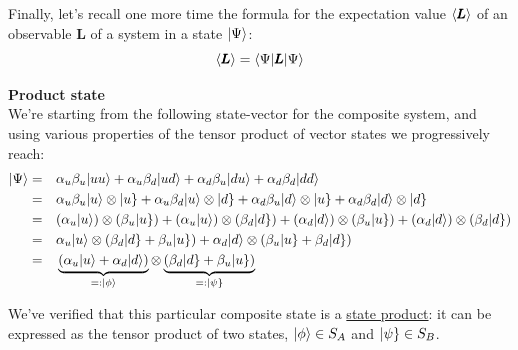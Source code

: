 \documentclass[solutions.tex]{subfiles}
\begin{document}
Finally, let's recall one more time the formula for the expectation value
$\left\langle \pmb{L} \right\rangle$ of an observable $\bm{L}$ of a system in a state $|\Psi\rangle$:
\[
	\left\langle \pmb{L} \right\rangle = \langle \Psi|\pmb{L}|\Psi\rangle
\]

\hr

\textbf{Product state}\ \\

We're starting from the following state-vector for the composite
system, and using various properties of the tensor product of
vector states we progressively reach:
\begin{equation*}\begin{aligned}
	|\Psi\rangle &=&& \alpha_u\beta_u|uu\rangle
		+\alpha_u\beta_d|ud\rangle
		+\alpha_d\beta_u|du\rangle
		+\alpha_d\beta_d|dd\rangle \\
	~ &=&& \alpha_u\beta_u|u\rangle\otimes|u\}
		+\alpha_u\beta_d|u\rangle\otimes|d\}
		+\alpha_d\beta_u|d\rangle\otimes|u\}
		+\alpha_d\beta_d|d\rangle\otimes|d\} \\
	~ &=&& (\alpha_u|u\rangle)\otimes(\beta_u|u\})
		+(\alpha_u|u\rangle)\otimes(\beta_d|d\})
		+(\alpha_d|d\rangle)\otimes(\beta_u|u\})
		+(\alpha_d|d\rangle)\otimes(\beta_d|d\}) \\
	~ &=&& \alpha_u|u\rangle\otimes(\beta_d|d\} + \beta_u|u\})
		+ \alpha_d|d\rangle\otimes(\beta_u|u\} + \beta_d|d\}) \\
	~ &=&& \underbrace{(\alpha_u|u\rangle+ \alpha_d|d\rangle)}_{=:|\phi\rangle}
		\otimes\underbrace{(\beta_d|d\} + \beta_u|u\})}_{=:|\psi\}} \\
\end{aligned}\end{equation*}

We've verified that this particular composite state is a
\underline{state product}: it can be expressed as the tensor product of
two states, $|\phi\rangle\in S_A$ and $|\psi\}\in S_B$. \\
\end{document}
